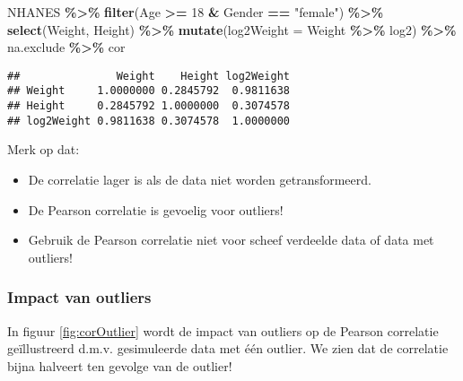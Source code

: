 \documentclass[
  12pt,dutch,coursenotes]{book}
\newenvironment{Shaded}{\begin{snugshade}}{\end{snugshade}}
\newcommand{\DataTypeTok}[1]{\textcolor[rgb]{0.13,0.29,0.53}{#1}}
\newcommand{\DecValTok}[1]{\textcolor[rgb]{0.00,0.00,0.81}{#1}}
\newcommand{\KeywordTok}[1]{\textcolor[rgb]{0.13,0.29,0.53}{\textbf{#1}}}
\newcommand{\NormalTok}[1]{#1}
\newcommand{\OperatorTok}[1]{\textcolor[rgb]{0.81,0.36,0.00}{\textbf{#1}}}
\newcommand{\StringTok}[1]{\textcolor[rgb]{0.31,0.60,0.02}{#1}}
\providecommand{\tightlist}{%
  \setlength{\itemsep}{0pt}\setlength{\parskip}{0pt}}
\theoremstyle{definition}
\theoremstyle{definition}
\theoremstyle{definition}
\theoremstyle{remark}
\begin{document}
\begin{Shaded}
\begin{Highlighting}[]
\NormalTok{NHANES }\OperatorTok{\%\textgreater{}\%}\StringTok{ }\KeywordTok{filter}\NormalTok{(Age }\OperatorTok{\textgreater{}=}\StringTok{ }\DecValTok{18} \OperatorTok{\&}\StringTok{ }\NormalTok{Gender }\OperatorTok{==}\StringTok{ "female"}\NormalTok{) }\OperatorTok{\%\textgreater{}\%}\StringTok{ }
\StringTok{    }\KeywordTok{select}\NormalTok{(Weight, Height) }\OperatorTok{\%\textgreater{}\%}\StringTok{ }\KeywordTok{mutate}\NormalTok{(}\DataTypeTok{log2Weight =}\NormalTok{ Weight }\OperatorTok{\%\textgreater{}\%}\StringTok{ }
\StringTok{    }\NormalTok{log2) }\OperatorTok{\%\textgreater{}\%}\StringTok{ }\NormalTok{na.exclude }\OperatorTok{\%\textgreater{}\%}\StringTok{ }\NormalTok{cor}
\end{Highlighting}
\end{Shaded}

\begin{verbatim}
##               Weight    Height log2Weight
## Weight     1.0000000 0.2845792  0.9811638
## Height     0.2845792 1.0000000  0.3074578
## log2Weight 0.9811638 0.3074578  1.0000000
\end{verbatim}

Merk op dat:

\begin{itemize}
\tightlist
\item
  De correlatie lager is als de data niet worden getransformeerd.
\item
  De Pearson correlatie is gevoelig voor outliers!
\item
  Gebruik de Pearson correlatie niet voor scheef verdeelde data of data met outliers!
\end{itemize}

\hypertarget{impact-van-outliers}{%
\subsubsection{Impact van outliers}\label{impact-van-outliers}}

In figuur \ref{fig:corOutlier} wordt de impact van outliers op de Pearson correlatie geïllustreerd d.m.v. gesimuleerde data met één outlier. We zien dat de correlatie bijna halveert ten gevolge van de outlier!
\end{document}
